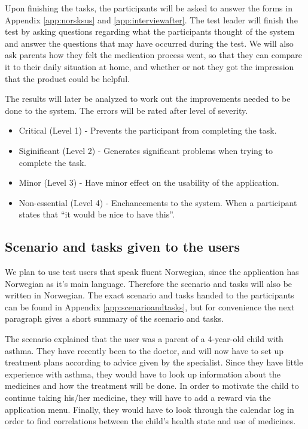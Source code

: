 Upon finishing the tasks, the participants will be asked to answer the forms in Appendix \ref{app:norsksus} and \ref{app:interviewafter}. The test leader will finish the test by asking questions regarding what the participants thought of the system and answer the questions that may have occurred during the test. We will also ask parents how they felt the medication process went, so that they can compare it to their daily situation at home, and whether or not they got the impression that the product could be helpful.  

The results will later be analyzed to work out the improvements needed to be done to the system. The errors will be rated after level of severity\cite{dumas1995practical}. 

\begin{itemize}
\item{Critical (Level 1) - Prevents the participant from completing the task.}
\item{Siginificant (Level 2) - Generates significant problems when trying to complete the task.}
\item{Minor (Level 3) - Have minor effect on the usability of the application.}
\item{Non-essential (Level 4) - Enchancements to the system. When a participant states that ``it would be nice to have this''.}
\end{itemize}



\subsection{Scenario and tasks given to the users}
We plan to use test users that speak fluent Norwegian, since the application has Norwegian as it's main language. Therefore the scenario and tasks will also be written in Norwegian. The exact scenario and tasks handed to the participants can be found in Appendix \ref{app:scenarioandtasks}, but for convenience the next paragraph gives a short summary of the scenario and tasks.

The scenario explained that the user was a parent of a 4-year-old child with asthma. They have recently been to the doctor, and will now have to set up treatment plans according to advice given by the specialist. Since they have little experience with asthma, they would have to look up information about the medicines and how the treatment will be done. In order to motivate the child to continue taking his/her medicine, they will have to add a reward via the application menu. Finally, they would have to look through the calendar log in order to find correlations between the child's health state and use of medicines. 
